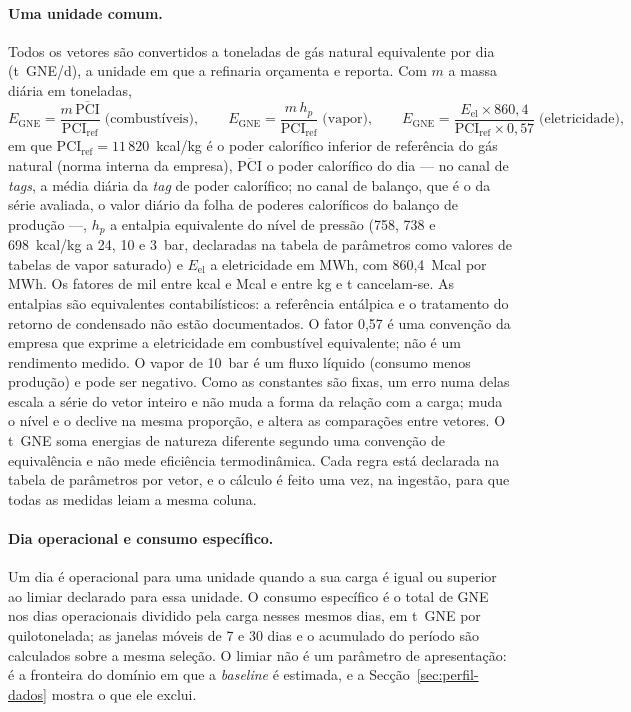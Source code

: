 \paragraph{Uma unidade comum.} Todos os vetores são convertidos a
toneladas de gás natural equivalente por dia (t~GNE/d), a unidade em que
a refinaria orçamenta e reporta. Com $m$ a massa diária em toneladas,
\begin{equation}
E_{\mathrm{GNE}} = \frac{m\,\overline{\mathrm{PCI}}}{\mathrm{PCI}_{\mathrm{ref}}}
\;\text{(combustíveis)},\qquad
E_{\mathrm{GNE}} = \frac{m\,h_p}{\mathrm{PCI}_{\mathrm{ref}}}
\;\text{(vapor)},\qquad
E_{\mathrm{GNE}} = \frac{E_{\mathrm{el}}\times 860{,}4}{\mathrm{PCI}_{\mathrm{ref}}\times 0{,}57}
\;\text{(eletricidade)},
\label{eq:conversao-gne}
\end{equation}
em que $\mathrm{PCI}_{\mathrm{ref}} = 11\,820$~kcal/kg é o poder calorífico
inferior de referência do gás natural (norma interna da empresa),
$\overline{\mathrm{PCI}}$ o poder calorífico do dia --- no canal de
\emph{tags}, a média diária da \emph{tag} de poder calorífico; no canal de
balanço, que é o da série avaliada, o valor diário da folha de poderes
caloríficos do balanço de produção ---, $h_p$ a entalpia equivalente do nível de pressão (758, 738 e
698~kcal/kg a 24, 10 e 3~bar, declaradas na tabela de parâmetros como
valores de tabelas de vapor saturado) e $E_{\mathrm{el}}$ a eletricidade em
MWh, com 860,4~Mcal por MWh. Os fatores de mil entre kcal e Mcal e entre kg
e t cancelam-se. As entalpias são equivalentes contabilísticos: a referência
entálpica e o tratamento do retorno de condensado não estão documentados. O
fator 0,57 é uma convenção da empresa que exprime a eletricidade em
combustível equivalente; não é um rendimento medido. O vapor de 10~bar é um
fluxo líquido (consumo menos produção) e pode ser negativo. Como as
constantes são fixas, um erro numa delas escala a série do vetor inteiro e
não muda a forma da relação com a carga; muda o nível e o declive na mesma
proporção, e altera as comparações entre vetores. O t~GNE soma energias de natureza
diferente segundo uma convenção de equivalência e não mede eficiência
termodinâmica. Cada regra está
declarada na tabela de parâmetros por vetor, e o cálculo é feito uma vez,
na ingestão, para que todas as medidas leiam a mesma coluna.

\paragraph{Dia operacional e consumo específico.} Um dia é operacional
para uma unidade quando a sua carga é igual ou superior ao limiar declarado
para essa unidade. O consumo específico é o total de GNE nos dias
operacionais dividido pela carga nesses mesmos dias, em t~GNE por
quilotonelada; as janelas móveis de 7 e 30 dias e o acumulado do período
são calculados sobre a mesma seleção. O limiar não é um parâmetro de
apresentação: é a fronteira do domínio em que a \emph{baseline} é estimada,
e a Secção~\ref{sec:perfil-dados} mostra o que ele exclui.

